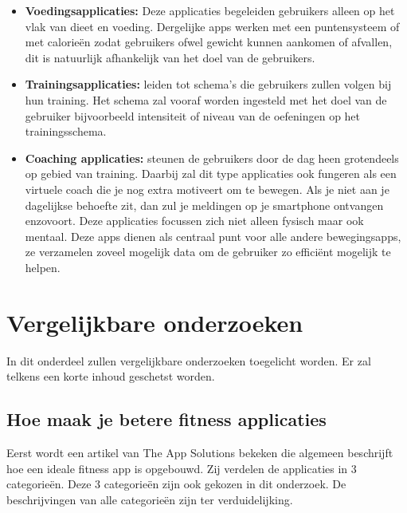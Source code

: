 \begin{itemize}
\setlength\itemsep{1em}
\item {\bf Voedingsapplicaties:} Deze applicaties begeleiden gebruikers alleen op het vlak van dieet en voeding. Dergelijke apps werken met een puntensysteem of met calorieën zodat gebruikers ofwel gewicht kunnen aankomen of afvallen, dit is natuurlijk afhankelijk van het doel van de gebruikers.

\item {\bf Trainingsapplicaties:} leiden tot schema’s die gebruikers zullen volgen bij hun training. Het schema zal vooraf worden ingesteld met het doel van de gebruiker bijvoorbeeld intensiteit of niveau van de oefeningen op het trainingsschema.

\item {\bf Coaching applicaties:} steunen de gebruikers door de dag heen grotendeels op gebied van training. Daarbij zal dit type applicaties ook fungeren als een virtuele coach die je nog extra motiveert om te bewegen. Als je niet aan je dagelijkse behoefte zit, dan zul je meldingen op je smartphone ontvangen enzovoort. Deze applicaties focussen zich niet alleen fysisch maar ook mentaal. Deze apps dienen als centraal punt voor alle andere bewegingsapps, ze verzamelen zoveel mogelijk data om de gebruiker zo efficiënt mogelijk te helpen.

\end{itemize}

\section{Vergelijkbare onderzoeken}
\label{sec:vergelijkbare-onderzoeken}

In dit onderdeel zullen vergelijkbare onderzoeken toegelicht worden. Er zal telkens een korte inhoud geschetst worden. 

\subsection{Hoe maak je betere fitness applicaties}
\label{sec:betere-apps}

Eerst wordt een artikel van The App Solutions \autocite{TheAppSolutions2017} bekeken die algemeen beschrijft hoe een ideale fitness app is opgebouwd. Zij verdelen de applicaties in 3 categorieën. Deze 3 categorieën zijn ook gekozen in dit onderzoek. De beschrijvingen van alle categorieën zijn ter verduidelijking.

